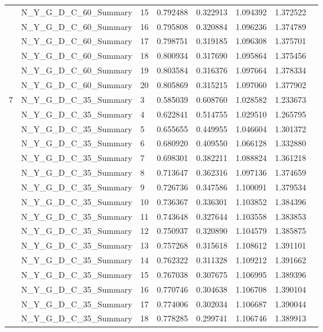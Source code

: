 \documentclass[a4paper,12pt]{article}
\begin{document}
\begin{center}
\begin{longtable}{lrlrrrrr}
& N\_Y\_G\_D\_C\_60\_Summary & 15 & 0.792488 & 0.322913 & 1.094392 & 1.372522 \\
& N\_Y\_G\_D\_C\_60\_Summary & 16 & 0.795808 & 0.320884 & 1.096236 & 1.374789 \\
& N\_Y\_G\_D\_C\_60\_Summary & 17 & 0.798751 & 0.319185 & 1.096308 & 1.375701 \\
& N\_Y\_G\_D\_C\_60\_Summary & 18 & 0.800934 & 0.317690 & 1.095864 & 1.375456 \\
& N\_Y\_G\_D\_C\_60\_Summary & 19 & 0.803584 & 0.316376 & 1.097664 & 1.378334 \\
& N\_Y\_G\_D\_C\_60\_Summary & 20 & 0.805869 & 0.315215 & 1.097060 & 1.377902 \\ \hline
\multirow{18}{1cm}{7}  & N\_Y\_G\_D\_C\_35\_Summary & 3 & 0.585039 & 0.608760 & 1.028582 & 1.233673 \\
& N\_Y\_G\_D\_C\_35\_Summary & 4 & 0.622841 & 0.514755 & 1.029510 & 1.265795 \\
& N\_Y\_G\_D\_C\_35\_Summary & 5 & 0.655655 & 0.449955 & 1.046604 & 1.301372 \\
& N\_Y\_G\_D\_C\_35\_Summary & 6 & 0.680920 & 0.409550 & 1.066128 & 1.332880 \\
& N\_Y\_G\_D\_C\_35\_Summary & 7 & 0.698301 & 0.382211 & 1.088824 & 1.361218 \\
& N\_Y\_G\_D\_C\_35\_Summary & 8 & 0.713647 & 0.362316 & 1.097136 & 1.374659 \\
& N\_Y\_G\_D\_C\_35\_Summary & 9 & 0.726736 & 0.347586 & 1.100091 & 1.379534 \\
& N\_Y\_G\_D\_C\_35\_Summary & 10 & 0.736367 & 0.336301 & 1.103852 & 1.384396 \\
& N\_Y\_G\_D\_C\_35\_Summary & 11 & 0.743648 & 0.327644 & 1.103558 & 1.383853 \\
& N\_Y\_G\_D\_C\_35\_Summary & 12 & 0.750937 & 0.320890 & 1.104579 & 1.385875 \\
& N\_Y\_G\_D\_C\_35\_Summary & 13 & 0.757268 & 0.315618 & 1.108612 & 1.391101 \\
& N\_Y\_G\_D\_C\_35\_Summary & 14 & 0.762322 & 0.311328 & 1.109212 & 1.391662 \\
& N\_Y\_G\_D\_C\_35\_Summary & 15 & 0.767038 & 0.307675 & 1.106995 & 1.389396 \\
& N\_Y\_G\_D\_C\_35\_Summary & 16 & 0.770746 & 0.304638 & 1.106708 & 1.390104 \\
& N\_Y\_G\_D\_C\_35\_Summary & 17 & 0.774006 & 0.302034 & 1.106687 & 1.390044 \\
& N\_Y\_G\_D\_C\_35\_Summary & 18 & 0.778285 & 0.299741 & 1.106746 & 1.389913 \\

\end{longtable}
\end{center}
\end{document}
